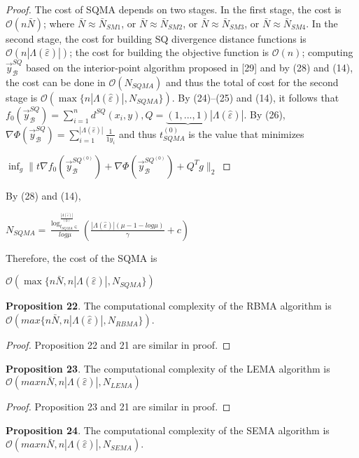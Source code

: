 \documentclass[]{iosart2c}
\begin{document}
\begin{proof}The cost of SQMA depends on two stages. In
the first stage, the cost is $\mathcal{O}(n\bar N)$; where $\bar N \approx \bar N_{SM1}$, or $\bar N \approx \bar N_{SM2}$, or $\bar N \approx \bar N_{SM3}$, or $\bar N \approx \bar N_{SM4}$. In the
second stage, the cost for building SQ divergence distance
functions is $\mathcal{O}(n |\Lambda(\hat{\varepsilon})|)$; the cost for building
the objective function is $\mathcal{O}(n)$; computing $\vec{y}^{SQ}_\mathcal{B}$ based
on the interior-point algorithm proposed in [29] and
by (28) and (14), the cost can be done in $\mathcal{O}(N_{SQMA})$
and thus the total of cost for the second stage is
$\mathcal{O}(\max\{n |\Lambda(\hat{\varepsilon})|,N_{SQMA}\})$. By (24)–(25) and (14),
it follows that $f_0 \left( \vec{y}^{SQ}_\mathcal{B} \right) = \sum^n_{i=1} d^{SQ}(x_i, y), Q = \underbrace{(1, ... , 1)}{|\Lambda(\hat{\varepsilon})|}$. By (26), $\nabla \Phi \left( \vec{y}^{SQ}_\mathcal{B} \right) = \sum^{|\Lambda(\hat{\varepsilon})|}_{i=1} \frac{1}{1
y_i}$
and
thus $t^{(0)}_{SQMA}$ is the value that minimizes

$\inf_g\parallel t\nabla f_0 \left( \vec{y}^{SQ^{(0)}}_\mathcal{B} \right) +\nabla \Phi \left( \vec{y}^{SQ^{(0)}}_\mathcal{B} \right) + Q^T g \parallel_2$
\end{proof}
By (28) and (14),

$N_{SQMA} =  \frac{ \log^{\frac{|\Lambda(\hat{\varepsilon})|}{(0)}}_{t_{SQMA} \in}}{log\mu}  \left( \frac{|\Lambda(\hat{\varepsilon})| (\mu - 1 - log\mu)}{\gamma} + c \right)$

Therefore, the cost of the SQMA is

$\mathcal{O}(\max\{n \bar N, n |\Lambda(\hat{\varepsilon})|,N_{SQMA}\})$

\textbf{Proposition 22}. The computational complexity of the RBMA algorithm is $\mathcal{O}(max\{n \bar N, n |\Lambda(\hat{\varepsilon})|,N_{RBMA}\})$.

\begin{proof}Proposition 22 and 21 are similar in proof. 
\end{proof}
\textbf{Proposition 23}. The computational complexity of the LEMA algorithm is $\mathcal{O}(max{n \bar N, n |\Lambda(\hat{\varepsilon})|,N_{LEMA}})$

\begin{proof}Proposition 23 and 21 are similar in proof.
\end{proof}
\textbf{Proposition 24}. The computational complexity of the
SEMA algorithm is $\mathcal{O}(max{n \bar N, n |\Lambda(\hat{\varepsilon})|,N_{SEMA}})$.
\end{document}
